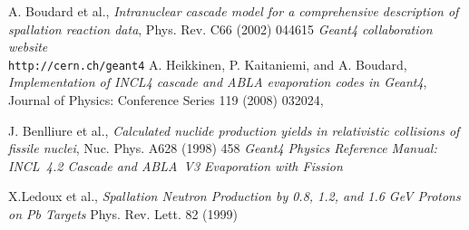 \documentclass[20pt]{article}
\newenvironment{textbox}
{\begin{lrbox}{\dummybox}\begin{minipage}{0.9\columnwidth}}
{\end{minipage}\end{lrbox}\raisebox{-\depth}{\psshadowbox[framesep=1em,framearc=.1,shadow=true]{\usebox{\dummybox}}}\vspace{0.005\textheight}}
\begin{document}
\begin{center}
\begin{multicols}{3}
{\Large

%
%
% 
\begin{thebibliography}{9}

 A. Boudard et al., \emph{Intranuclear cascade model for
    a comprehensive description of spallation reaction data}, Phys.
  Rev. C66 (2002) 044615
 \emph{Geant4 collaboration website} \\ {\tt http://\-cern.ch/\-geant4}
A. Heikkinen, P. Kaitaniemi, and A. Boudard,
{\em Implementation of INCL4 cascade and ABLA evaporation codes in Geant4},
Journal of Physics: Conference Series 119 (2008) 032024, 
{\sf [doi:10.1088/1742-6596/119/3/032024]}

 J. Benlliure et al., \emph{Calculated nuclide
    production yields in relativistic collisions of fissile nuclei},
  Nuc. Phys. A628 (1998) 458
 \emph{Geant4 Physics Reference Manual: INCL~4.2 Cascade and ABLA~V3 Evaporation with Fission} 

 X.Ledoux et al., \emph{Spallation Neutron Production by
  0.8, 1.2, and 1.6 GeV Protons on Pb Targets} Phys. Rev. Lett. 82
  (1999)






\end{thebibliography}}
\end{multicols}
\end{center}
\end{document}
